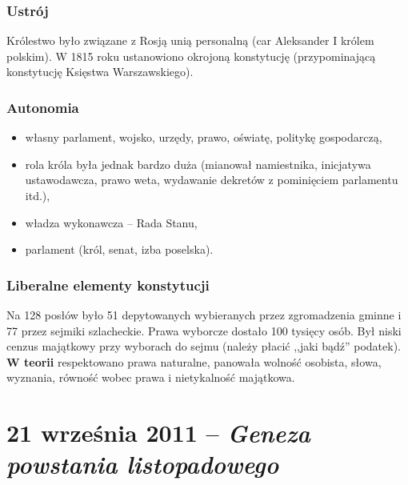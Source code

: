 \documentclass [a4paper, 11pt, oneside]{book}
\begin{document}
        \subsection{Ustrój} %
        \label{sub:ustr_j}
            Królestwo było związane z Rosją unią personalną (car Aleksander I królem polskim). W 1815 roku ustanowiono okrojoną konstytucję (przypominającą konstytucję Księstwa Warszawskiego).
        \subsection{Autonomia} %
        \label{sub:autonomia}
            \begin{itemize}
                \item własny parlament, wojsko, urzędy, prawo, oświatę, politykę gospodarczą,
                \item rola króla była jednak bardzo duża (mianował namiestnika, inicjatywa ustawodawcza, prawo weta, wydawanie dekretów z pominięciem parlamentu itd.),
                \item władza wykonawcza -- Rada Stanu,
                \item parlament (król, senat, izba poselska).
            \end{itemize}
        \subsection{Liberalne elementy konstytucji} %
        \label{sub:liberalne_elementy_konstytucji}
            Na 128 posłów było 51 depytowanych wybieranych przez zgromadzenia gminne i 77 przez sejmiki szlacheckie. Prawa wyborcze dostało 100 tysięcy osób. Był niski cenzus majątkowy przy wyborach do sejmu (należy płacić ,,jaki bądź'' podatek). \textbf{W teorii} respektowano prawa naturalne, panowała wolność osobista, słowa, wyznania, równość wobec prawa i nietykalność majątkowa.
\chapter{21 września 2011 -- \textit{Geneza powstania listopadowego}} %
\label{cha:21_wrze_nia_2011_textit}
\end{document}
